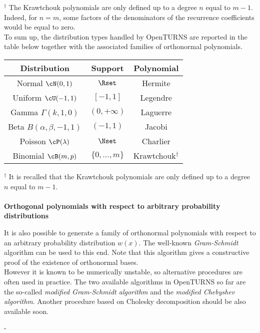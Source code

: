 {\begin{center}
\begin{tabular}{|c|c|c|c|}
    \end{tabular}

  \end{center}
  {\footnotesize $^{\dagger}$ The Krawtchouk polynomials are only defined up to a degree $n$ equal to $m-1$. Indeed, for $n=m$, some factors of the denominators of the recurrence coefficients would be equal to zero.} \\

  To sum up, the distribution types handled by OpenTURNS are reported in the table below together with the associated families of orthonormal polynomials. \\

  \begin{center}
    \begin{tabular}{ccc}
      \hline
      Distribution & Support & Polynomial \\
      \hline
      Normal $\cN(0,1)$      &  $\Rset$ & Hermite \\
      Uniform   $\cU(-1,1)$     &   $[-1,1] $     & Legendre \\
      Gamma $\Gamma(k,1,0)$   & $(0,+\infty)$   & Laguerre \\
      Beta $B(\alpha,\beta,-1,1)$     &  $(-1,1)$       & Jacobi \\
      Poisson $\cP(\lambda)$ & $\Nset$ & Charlier \\
      Binomial $\cB(m,p)$ & $\{0,\dots,m\}$ & Krawtchouk$^{\dagger}$ \\
      \hline
    \end{tabular}
  \end{center}
      {\footnotesize $^{\dagger}$ It is recalled that the Krawtchouk polynomials are only defined up to a degree $n$ equal to $m-1$.} \\
      \\

      \textbf{Orthogonal polynomials with respect to arbitrary probability distributions} \vspace{2mm}

      It is also possible to generate a family of orthonormal polynomials with respect to an arbitrary probability distribution $w(x)$. The well-known \emph{Gram-Schmidt} algorithm can be used to this end. Note that this algorithm gives a constructive proof of the existence of orthonormal bases.\\

      However it is known to be numerically unstable, so alternative procedures are often used in practice. The two available algorithms in OpenTURNS so far are the so-called \emph{modified Gram-Schmidt algorithm} and the \emph{modified Chebyshev algorithm}. Another procedure based on Cholesky decomposition should be also available soon.
        }
        {-
        }

